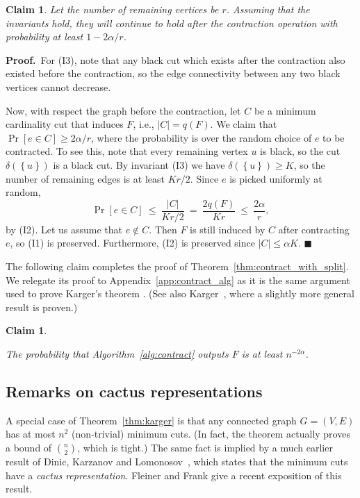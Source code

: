 \documentclass[11pt]{article}
\newcommand{\proofbelow}{8pt}
\numberwithin{equation}{section}
\newtheorem{claim}[theorem]{Claim}
\renewenvironment{proof}{\noindent\textbf{Proof.}\,}{\afterproof}
\newcommand{\afterproof}{\hfill $\blacksquare$ \par \vspace{\proofbelow}}
\newcommand{\newterm}[1]{\textit{#1}}
\newcommand{\abs}[1]{\lvert #1 \rvert}
\newcommand{\card}[1]{\abs{#1}}
\newcommand{\set}[1]{\left \{ #1 \right \}}                     \newcommand{\setst}[2]{\left\{\; #1 \,:\, #2 \;\right\}}
\newcommand{\Algorithm}[1]{Algorithm~\ref{alg:#1}}
\newcommand{\Appendix}[1]{Appendix~\ref{app:#1}}
\newcommand{\ClaimName}[1]{\label{clm:#1}}
\newcommand{\Theorem}[1]{Theorem~\ref{thm:#1}}
\begin{document}
\begin{claim}
\ClaimName{contract}
Let the number of remaining vertices be $r$.
Assuming that the invariants hold,
they will continue to hold after the contraction operation
with probability at least $1-2\alpha/r$.
\end{claim}
\begin{proof}
For (I3), note that
any black cut which exists after the contraction
also existed before the contraction,
so the edge connectivity between any two black vertices cannot decrease.

Now, with respect the graph before the contraction,
let $C$ be a minimum cardinality cut that induces $F$,
i.e., $\card{C}=q(F)$.
We claim that $\Pr[ e \in C ] \geq 2 \alpha / r$,
where the probability is over the random choice of $e$ to be contracted.
To see this, note that every remaining vertex $u$ is black, 
so the cut $\delta(\set{u})$ is a black cut.
By invariant (I3) we have $\delta(\set{u}) \geq K$,
so the number of remaining edges is at least $K r / 2$.
Since $e$ is picked uniformly at random,
$$
\Pr[ e \in C ]
 ~\leq~ \frac{\card{C}}{K r / 2}
 ~=~ \frac{2 q(F)}{K r}
 ~\leq~ \frac{2\alpha}{r},
$$
by (I2).
Let us assume that $e \not \in C$.
Then $F$ is still induced by $C$ after contracting $e$, so (I1) is preserved. 
Furthermore, (I2) is preserved since $\card{C} \leq \alpha K$.
\end{proof}

The following claim completes the proof of \Theorem{contract_with_split}.
We relegate its proof to \Appendix{contract_alg} as it is the same argument used
to prove Karger's theorem \cite{KargerContract,KargerStein}.
(See also Karger~\cite[App.~A]{KargerSkel}, where a slightly more general result is proven.)

\newcommand{\clmoutput}{
    The probability that \Algorithm{contract} outputs $F$ is at least $n^{-2\alpha}$.
}
\begin{claim}
\ClaimName{output}
\clmoutput
\end{claim}




\subsection{Remarks on cactus representations}

A special case of \Theorem{karger} is that any connected graph $G=(V,E)$ has at most
$n^2$ (non-trivial) minimum cuts.
(In fact, the theorem actually proves a bound of $\binom{n}{2}$, which is tight.)
The same fact is implied by a much earlier result of Dinic, Karzanov and Lomonosov~\cite{DKL},
which states that the minimum cuts have a \newterm{cactus representation}.
Fleiner and Frank \cite{FleinerFrank} give a recent exposition of this result.
\end{document}
